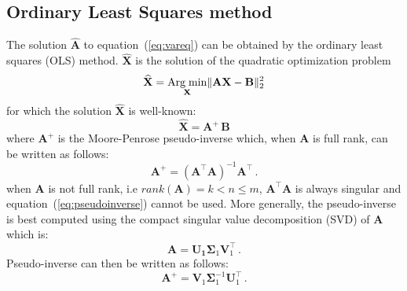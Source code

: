 \subsection{Ordinary Least Squares method}

The solution $\widehat{\mathbf{A}}$ to
equation~(\ref{eq:vareq}) can be obtained by the ordinary least squares (OLS)
method. $\widehat{\mathbf{X}}$ is the solution of the quadratic optimization problem
\begin{equation*}
\widehat{\mathbf{X}} = \underset{\mathbf{X}}{\text{Arg\;min}}
\|\mathbf{A}\mathbf{X}-\mathbf{B}\|_2^2
\end{equation*}
\noindent for which the solution $\widehat{\mathbf{X}}$ is well-known:
\begin{equation*}
\label{eq:MP}
\widehat{\mathbf{X}}=\mathbf{A}^{\!\!+}\,\mathbf{B}
\end{equation*}
\noindent where $\mathbf{A}^{\!\!+}$ is the Moore-Penrose pseudo-inverse
which, when $\mathbf{A}$ is full rank, can be written as follows: 
\begin{equation}
\label{eq:pseudoinverse}
\mathbf{A}^{\!\!+}= (\mathbf{A}^{\!\!\top} \mathbf{A})^{-1}\mathbf{A}^{\!\!\top} \, .
\end{equation}
when $\mathbf{A}$ is not full rank, i.e
$rank(\mathbf{A})=k <  n \leq m$, $\mathbf{A}^\top \mathbf{A}$ is
always singular and equation~(\ref{eq:pseudoinverse}) cannot be used.
More generally, the pseudo-inverse is best computed using the compact
singular value decomposition (SVD) of $\mathbf{A}$ which is:
\begin{equation*}
    \label{eq:compactsvd}
    \mathbf{A}=
    \mathbf{U_1}
    \boldsymbol \Sigma_1
    \mathbf{V}_1^{\top} \, .
\end{equation*}
Pseudo-inverse can then be written as follows:
\begin{equation*}
\label{eq:pseudoinversesvd}
\mathbf{A}^{\!\!+} = \mathbf{V}_1 \boldsymbol \Sigma_1^{-1} \mathbf{U}_1^\top \, .
\end{equation*}



